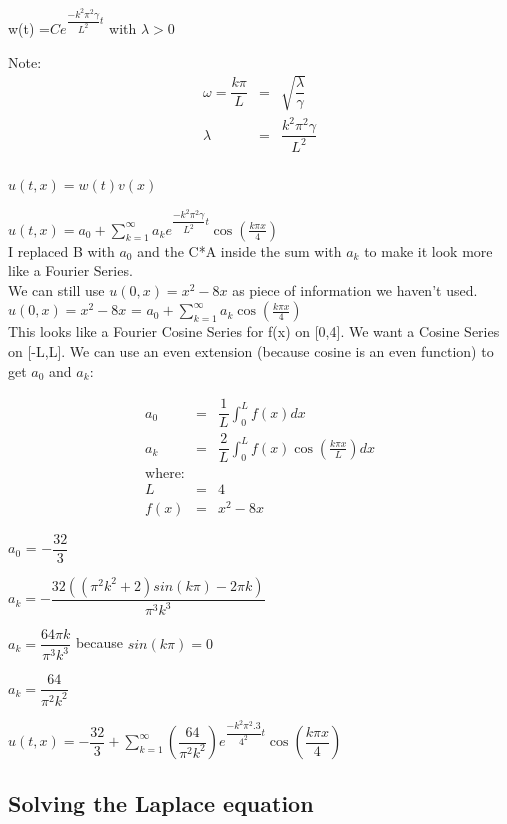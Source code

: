 \documentclass{article}
\newcommand{\bea}{\begin{eqnarray*}}
\newcommand{\eea}{\end{eqnarray*}}
\newcommand{\red}[1]{\textcolor{red}{#1}}
\begin{document}
w(t) =$Ce^{\dfrac{-k^2 \pi^2 \gamma }{L^2}t}$ with $\lambda > 0$

Note: \bea
\omega= \dfrac{k \pi}{L} &=& \sqrt{\dfrac{\lambda}{\gamma}} \\
\lambda &=& \dfrac{k^2 \pi^2 \gamma }{L^2} \\
\eea

$u(t,x) = w(t)v(x)$

$u(t,x) = a_0 + \sum_{k=1}^{\infty} a_k e^{\dfrac{-k^2 \pi^2 \gamma }{L^2}t} \cos\left(\frac{k \pi x}{4}\right)$ \\ 

I replaced B with $a_0$ and the C*A inside the sum with $a_k$ to make it look more like a Fourier Series. \\

We can still use $u(0,x)=x^2-8x$ as piece of information we haven't used.\\

$u(0,x)=x^2-8x$ = $a_0 + \sum_{k=1}^{\infty} a_k \cos\left(\frac{k \pi x}{4}\right)$ \\

This looks like a Fourier Cosine Series for f(x) on [0,4]. We want a Cosine Series on [-L,L]. We can use an even extension (because cosine is an even function) to get $a_0$ and $a_k$:

\bea
a_0 &=& \dfrac{1}{L}\int_{0}^{L} f(x)dx \\
a_k &=& \dfrac{2}{L}\int_{0}^{L} f(x)\cos\left(\frac{k \pi x}{L}\right)dx \\
\mbox{where}: \\
L&=&4\\
f(x) &=& x^2-8x
\eea

$a_0$ = $-\dfrac{32}{3}$

$a_k = -\dfrac{32((\pi^2 k^2 +2)sin(k \pi) - 2 \pi k)}{\pi^3 k ^3}$

$a_k = \dfrac{64 \pi k}{\pi^3 k ^3}$ because $sin(k\pi) = 0$ \newline

$a_k = \dfrac{64}{\pi^2 k ^2}$ \newline

$u(t,x) = -\dfrac{32}{3} + \sum_{k=1}^{\infty} \left(\dfrac{64}{\pi^2 k ^2}\right) e^{\dfrac{-k^2 \pi^2 .3 }{4^2}t} \cos\left(\dfrac{k \pi x}{4}\right)$ \\ 


\subsection{Solving the Laplace equation}
 
\end{document}
